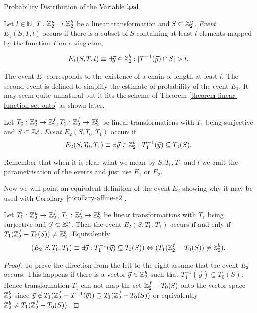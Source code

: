 \begin{section}{Probability Distribution of the Variable \texorpdfstring{$\mathbf{lpsl}$}{lpsl}}
\begin{definition}[Event $E_1(S, T, l)$]
Let $l \in \mathbb{N}$, $T: \mathbb{Z}_{2}^{u} \rightarrow \mathbb{Z}_{2}^{b}$ be a linear transformation and $S \subset \mathbb{Z}_{2}^{u}$. \emph{Event $E_1(S, T, l)$} occurs if there is a subset of $S$ containing at least $l$ elements mapped by the function $T$ on a singleton,

\[ 
	E_1(S, T, l) \equiv \exists \vec{y} \in \mathbb{Z}_{2}^{b}: | T^{-1}(\vec{y}) \cap S | > l \text{.}
\]
\end{definition}
The event $E_1$ corresponds to the existence of a chain of length at least $l$. The second event is defined to simplify the estimate of probability of the event $E_1$. It may seem quite unnatural but it fits the scheme of Theorem \ref{theorem-linear-function-set-onto} as shown later.
\begin{definition}[Event $E_2(S, T_0, T_1)$]
Let $T_0: \mathbb{Z}_{2}^{u} \rightarrow \mathbb{Z}_{2}^{f}, T_1: \mathbb{Z}_{2}^{f} \rightarrow \mathbb{Z}_{2}^{b}$ be linear transformations with $T_1$ being surjective and $S \subset \mathbb{Z}_{2}^{u}$. \emph{Event $E_2(S, T_0, T_1)$} occurs if
\[
	E_2(S, T_0, T_1) \equiv \exists \vec{y} \in \mathbb{Z}_{2}^{b}: T_1^{-1}(\vec{y}) \subseteq T_0(S) \text{.}
\]
\end{definition}

Remember that when it is clear what we mean by $S, T_0, T_1$ and $l$ we omit the parametrisation of the events and just use $E_1$ or $E_2$.

Now we will point an equivalent definition of the event $E_2$ showing why it may be used with Corollary $\ref{corollary-affine-e2}$.
\begin{remark}
\label{remark-e2-equivalency}
Let $T_0: \mathbb{Z}_{2}^{u} \rightarrow \mathbb{Z}_{2}^{f}$, $T_1: \mathbb{Z}_{2}^{f} \rightarrow \mathbb{Z}_{2}^{b}$ be linear transformations with $T_1$ being surjective and $S \subset \mathbb{Z}_{2}^{u}$. Then the event $E_2(S, T_0, T_1)$ occurs if and only if $T_1(\mathbb{Z}_{2}^{f} - T_0(S)) \neq \mathbb{Z}_{2}^{b}$. Equivalently
\[
	(E_2(S, T_0, T_1) \equiv \exists \vec{y}: T_1^{-1}(\vec{y}) \subseteq T_0(S)) \Leftrightarrow (T_1(\mathbb{Z}_{2}^{f} - T_0(S)) \neq \mathbb{Z}_{2}^{b}) \text{.}
\]
\end{remark}
\begin{proof}
To prove the direction from the left to the right assume that the event $E_2$ occurs. This happens if there is a vector $\vec{y} \in \mathbb{Z}_{2}^{b}$ such that $T_1^{-1}(\vec{y}) \subseteq T_0(S)$. Hence transformation $T_1$ can not map the set $\mathbb{Z}_{2}^{f} - T_0(S)$ onto the vector space $\mathbb{Z}_{2}^{b}$ since $\vec{y} \notin T_1(\mathbb{Z}_{2}^{f} - T^{-1}(\vec{y})) \supseteq T_1(\mathbb{Z}_{2}^{f} - T_0(S))$ or equivalently $\mathbb{Z}_{2}^{b} \neq T_1(\mathbb{Z}_{2}^{f} - T_0(S))$.


\end{proof}
\end{section}

